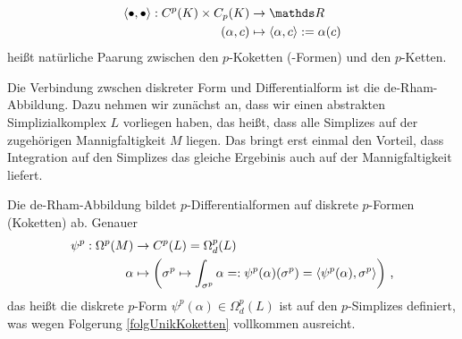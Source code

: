   \begin{definition}
    \begin{align}
      \begin{aligned}
        \left\langle \bullet,\bullet \right\rangle : C^{p}(K) \times C_{p}(K)  &\rightarrow \R \\
                                                     \left( \alpha, c  \right) &\mapsto \left\langle \alpha, c \right\rangle := \alpha(c)
      \end{aligned}
    \end{align}
    heißt natürliche Paarung zwischen den \( p \)-Koketten (-Formen) und den \( p \)-Ketten.
  \end{definition}

  Die Verbindung zwschen diskreter Form und Differentialform ist die de-Rham-Abbildung.
  Dazu nehmen wir zunächst an, dass wir einen abstrakten Simplizialkomplex \( L \) vorliegen haben, das heißt, dass alle Simplizes auf der zugehörigen Mannigfaltigkeit \( M \) liegen.
  Das bringt erst einmal den Vorteil, dass Integration auf den Simplizes das gleiche Ergebinis auch auf der Mannigfaltigkeit liefert.

  \begin{definition}
    Die de-Rham-Abbildung bildet \( p \)-Differentialformen auf diskrete \( p \)-Formen (Koketten) ab. 
    Genauer
    \begin{align}
      \begin{aligned}
        \psi^{p}: \Omega^{p}(M) &\rightarrow C^{p}(L) = \Omega_{d}^{p}(L)\\
                       \alpha   &\mapsto \left( \sigma^{p} \mapsto \int_{\sigma^{p}} \alpha =: \psi^{p}(\alpha)(\sigma^{p}) =  \left\langle \psi^{p}(\alpha), \sigma^{p} \right\rangle\right)
                       \,\text{,}
      \end{aligned}
    \end{align}
    das heißt die diskrete \( p \)-Form \( \psi^{p}(\alpha) \in \Omega_{d}^{p}(L)  \) ist auf den \( p \)-Simplizes definiert, was wegen Folgerung \ref{folgUnikKoketten} vollkommen ausreicht.
  \end{definition}

